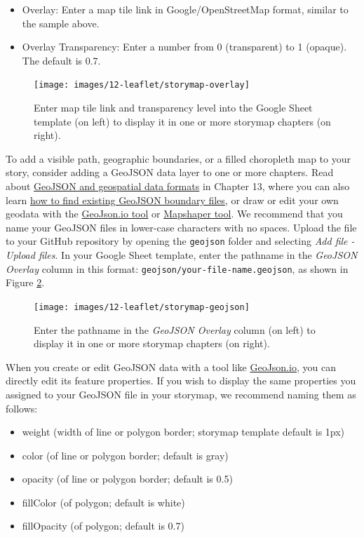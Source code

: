 \documentclass[
  english,
]{book}
\providecommand{\tightlist}{%
  \setlength{\itemsep}{0pt}\setlength{\parskip}{0pt}}
\begin{document}
\begin{itemize}
\tightlist
\item
  Overlay: Enter a map tile link in Google/OpenStreetMap format, similar to the sample above.
\item
  Overlay Transparency: Enter a number from 0 (transparent) to 1 (opaque). The default is 0.7.
\end{itemize}



\begin{figure}
\texttt{[image: images/12-leaflet/storymap-overlay]} \caption{Enter map tile link and transparency level into the Google Sheet template (on left) to display it in one or more storymap chapters (on right).}\label{fig:storymap-overlay}
\end{figure}

To add a visible path, geographic boundaries, or a filled choropleth map to your story, consider adding a GeoJSON data layer to one or more chapters. Read about \href{geojson.html}{GeoJSON and geospatial data formats} in Chapter 13, where you can also learn \href{find-geojson.html}{how to find existing GeoJSON boundary files}, or draw or edit your own geodata with the \href{geojsonio.html}{GeoJson.io tool} or \href{mapshaper.html}{Mapshaper tool}. We recommend that you name your GeoJSON files in lower-case characters with no spaces. Upload the file to your GitHub repository by opening the \texttt{geojson} folder and selecting \emph{Add file - Upload files}. In your Google Sheet template, enter the pathname in the \emph{GeoJSON Overlay} column in this format: \texttt{geojson/your-file-name.geojson}, as shown in Figure \ref{fig:storymap-geojson}.



\begin{figure}
\texttt{[image: images/12-leaflet/storymap-geojson]} \caption{Enter the pathname in the \emph{GeoJSON Overlay} column (on left) to display it in one or more storymap chapters (on right).}\label{fig:storymap-geojson}
\end{figure}

When you create or edit GeoJSON data with a tool like \href{geojsonio.html}{GeoJson.io}, you can directly edit its feature properties. If you wish to display the same properties you assigned to your GeoJSON file in your storymap, we recommend naming them as follows:

\begin{itemize}
\tightlist
\item
  weight (width of line or polygon border; storymap template default is 1px)
\item
  color (of line or polygon border; default is gray)
\item
  opacity (of line or polygon border; default is 0.5)
\item
  fillColor (of polygon; default is white)
\item
  fillOpacity (of polygon; default is 0.7)
\end{itemize}
\end{document}
